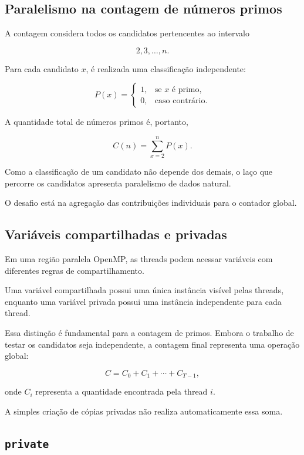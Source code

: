 \subsection{Paralelismo na contagem de números primos}

A contagem considera todos os candidatos pertencentes ao intervalo

\[
2,3,\ldots,n.
\]

Para cada candidato \(x\), é realizada uma classificação independente:

\[
P(x)=
\begin{cases}
1, & \text{se } x \text{ é primo},\\
0, & \text{caso contrário}.
\end{cases}
\]

A quantidade total de números primos é, portanto,

\[
C(n)=\sum_{x=2}^{n}P(x).
\]

Como a classificação de um candidato não depende dos demais, o laço que
percorre os candidatos apresenta paralelismo de dados natural.

O desafio está na agregação das contribuições individuais para o contador
global.


\subsection{Variáveis compartilhadas e privadas}

Em uma região paralela OpenMP, as threads podem acessar variáveis com
diferentes regras de compartilhamento.

Uma variável compartilhada possui uma única instância visível pelas
threads, enquanto uma variável privada possui uma instância independente
para cada thread.

Essa distinção é fundamental para a contagem de primos. Embora o trabalho
de testar os candidatos seja independente, a contagem final representa uma
operação global:

\[
C=C_0+C_1+\cdots+C_{T-1},
\]

onde \(C_i\) representa a quantidade encontrada pela thread \(i\).

A simples criação de cópias privadas não realiza automaticamente essa soma.


\subsection{\texttt{private}}


